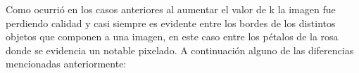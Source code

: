 \documentclass[a4paper]{article}
\begin{document}
Como ocurrió en los casos anteriores al aumentar el valor de k la imagen fue perdiendo calidad y casi siempre es evidente entre los bordes de los distintos objetos que componen a una imagen, en este caso entre los pétalos de la rosa donde se evidencia un notable pixelado.\newline  \newline \newline \newline \newline
A continuación alguno de las diferencias mencionadas anteriormente:
 \begin{figure}[H]
\centering
{}
\end{figure}
\end{document}
